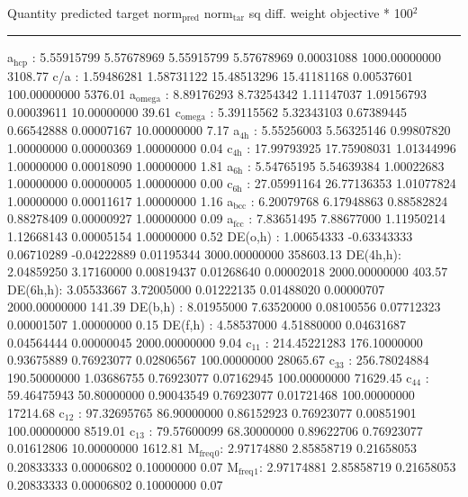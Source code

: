 \documentclass[11pt]{article}
\begin{document}
Quantity      predicted    target     norm\(_{\text{pred}}\)   norm\(_{\text{tar}}\)    sq diff.      weight    objective * 100\(^{\text{2}}\) 

\noindent\rule{\textwidth}{0.5pt}
a\(_{\text{hcp}}\)   :   5.55915799   5.57678969   5.55915799   5.57678969   0.00031088 1000.00000000      3108.77
c/a     :   1.59486281   1.58731122  15.48513296  15.41181168   0.00537601 100.00000000      5376.01
a\(_{\text{omega}}\) :   8.89176293   8.73254342   1.11147037   1.09156793   0.00039611  10.00000000        39.61
c\(_{\text{omega}}\) :   5.39115562   5.32343103   0.67389445   0.66542888   0.00007167  10.00000000         7.17
a\(_{\text{4h}}\)    :   5.55256003   5.56325146   0.99807820   1.00000000   0.00000369   1.00000000         0.04
c\(_{\text{4h}}\)    :  17.99793925  17.75908031   1.01344996   1.00000000   0.00018090   1.00000000         1.81
a\(_{\text{6h}}\)    :   5.54765195   5.54639384   1.00022683   1.00000000   0.00000005   1.00000000         0.00
c\(_{\text{6h}}\)    :  27.05991164  26.77136353   1.01077824   1.00000000   0.00011617   1.00000000         1.16
a\(_{\text{bcc}}\)   :   6.20079768   6.17948863   0.88582824   0.88278409   0.00000927   1.00000000         0.09
a\(_{\text{fcc}}\)   :   7.83651495   7.88677000   1.11950214   1.12668143   0.00005154   1.00000000         0.52
DE(o,h) :   1.00654333  -0.63343333   0.06710289  -0.04222889   0.01195344 3000.00000000    358603.13
DE(4h,h):   2.04859250   3.17160000   0.00819437   0.01268640   0.00002018 2000.00000000       403.57
DE(6h,h):   3.05533667   3.72005000   0.01222135   0.01488020   0.00000707 2000.00000000       141.39
DE(b,h) :   8.01955000   7.63520000   0.08100556   0.07712323   0.00001507   1.00000000         0.15
DE(f,h) :   4.58537000   4.51880000   0.04631687   0.04564444   0.00000045 2000.00000000         9.04
c\(_{\text{11}}\)    : 214.45221283 176.10000000   0.93675889   0.76923077   0.02806567 100.00000000     28065.67
c\(_{\text{33}}\)    : 256.78024884 190.50000000   1.03686755   0.76923077   0.07162945 100.00000000     71629.45
c\(_{\text{44}}\)    :  59.46475943  50.80000000   0.90043549   0.76923077   0.01721468 100.00000000     17214.68
c\(_{\text{12}}\)    :  97.32695765  86.90000000   0.86152923   0.76923077   0.00851901 100.00000000      8519.01
c\(_{\text{13}}\)    :  79.57600099  68.30000000   0.89622706   0.76923077   0.01612806  10.00000000      1612.81
M\(_{\text{freq}}\)\(_{\text{0}}\):   2.97174880   2.85858719   0.21658053   0.20833333   0.00006802   0.10000000         0.07
M\(_{\text{freq}}\)\(_{\text{1}}\):   2.97174881   2.85858719   0.21658053   0.20833333   0.00006802   0.10000000         0.07
\end{document}
